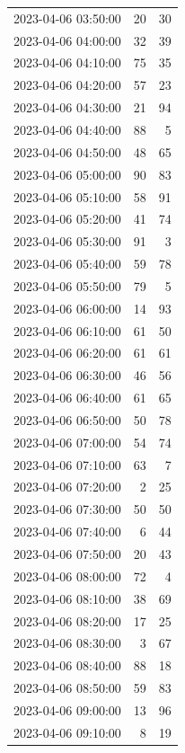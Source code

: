 \documentclass[
  letterpaper,
  DIV=11,
  numbers=noendperiod]{scrartcl}
\begin{document}
\begin{tabular}{lrr}
2023-04-06 03:50:00 &    20 &    30 \\
2023-04-06 04:00:00 &    32 &    39 \\
2023-04-06 04:10:00 &    75 &    35 \\
2023-04-06 04:20:00 &    57 &    23 \\
2023-04-06 04:30:00 &    21 &    94 \\
2023-04-06 04:40:00 &    88 &     5 \\
2023-04-06 04:50:00 &    48 &    65 \\
2023-04-06 05:00:00 &    90 &    83 \\
2023-04-06 05:10:00 &    58 &    91 \\
2023-04-06 05:20:00 &    41 &    74 \\
2023-04-06 05:30:00 &    91 &     3 \\
2023-04-06 05:40:00 &    59 &    78 \\
2023-04-06 05:50:00 &    79 &     5 \\
2023-04-06 06:00:00 &    14 &    93 \\
2023-04-06 06:10:00 &    61 &    50 \\
2023-04-06 06:20:00 &    61 &    61 \\
2023-04-06 06:30:00 &    46 &    56 \\
2023-04-06 06:40:00 &    61 &    65 \\
2023-04-06 06:50:00 &    50 &    78 \\
2023-04-06 07:00:00 &    54 &    74 \\
2023-04-06 07:10:00 &    63 &     7 \\
2023-04-06 07:20:00 &     2 &    25 \\
2023-04-06 07:30:00 &    50 &    50 \\
2023-04-06 07:40:00 &     6 &    44 \\
2023-04-06 07:50:00 &    20 &    43 \\
2023-04-06 08:00:00 &    72 &     4 \\
2023-04-06 08:10:00 &    38 &    69 \\
2023-04-06 08:20:00 &    17 &    25 \\
2023-04-06 08:30:00 &     3 &    67 \\
2023-04-06 08:40:00 &    88 &    18 \\
2023-04-06 08:50:00 &    59 &    83 \\
2023-04-06 09:00:00 &    13 &    96 \\
2023-04-06 09:10:00 &     8 &    19 \\

\end{tabular}
\end{document}
